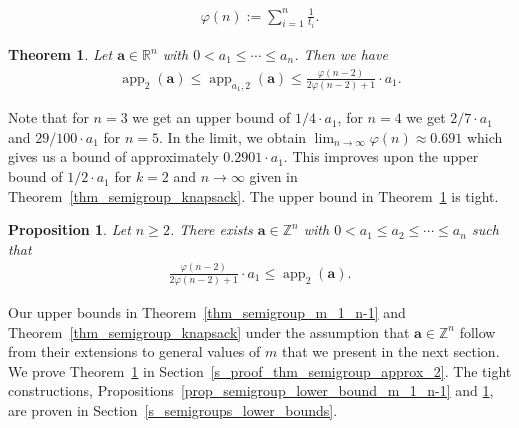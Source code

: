 \documentclass[pdflatex]{sn-jnl}
\DeclareMathOperator{\app}{app}
\newcommand{\R}{\mathbb{R}}
\newcommand{\Z}{\mathbb{Z}}
\newcommand{\ba}{\bm{a}}
\theoremstyle{thmstyleone}%
\newtheorem{theorem}{Theorem}%
\newtheorem{proposition}{Proposition}
\theoremstyle{thmstyletwo}%
\theoremstyle{thmstylethree}%
\begin{document}
	\begin{align*}
		\varphi(n) := \sum_{i=1}^n \frac{1}{t_i}.
	\end{align*}
	
	\begin{theorem}
		\label{thm_semigroup_approx_2}
		Let $\ba\in\R^{n}$ with $0 < a_1\leq \cdots\leq a_n$. Then we have
		\begin{align*}
			\app_2(\ba)\leq \app_{a_1,2}(\ba)\leq\frac{\varphi(n - 2)}{2\varphi(n - 2) + 1}\cdot a_1.
		\end{align*}
	\end{theorem}
	Note that for $n=3$ we get an upper bound of $1/4\cdot a_1$, for $n=4$ we get $2/7\cdot a_1$ and $29/100\cdot a_1$ for $n = 5$. In the limit, we obtain $\lim_{n\to\infty}\varphi(n) \approx 0.691$ which gives us a bound of approximately $0.2901\cdot a_1$. This improves upon the upper bound of $1/2\cdot a_1$ for $k=2$ and $n\to \infty$ given in Theorem~\ref{thm_semigroup_knapsack}. The upper bound in Theorem~\ref{thm_semigroup_approx_2} is tight.
	\begin{proposition}
		\label{prop_semigroup_lower_bound_m_1_n_2}
		Let $n\geq 2$. There exists $\ba\in \Z^{n}$ with $0<a_1\leq a_2\leq\cdots\leq a_n$ such that 
		\begin{align*}
			\frac{\varphi(n-2)}{2\varphi(n-2) + 1}\cdot a_1 \leq \app_2(\ba).
		\end{align*}
	\end{proposition}
	Our upper bounds in Theorem~\ref{thm_semigroup_m_1_n-1} and Theorem~\ref{thm_semigroup_knapsack} under the assumption that $\ba\in \Z^n$ follow from their extensions to general values of $m$ that we present in the next section. 
	We prove Theorem~\ref{thm_semigroup_approx_2} in Section~\ref{s_proof_thm_semigroup_approx_2}. The tight constructions, Propositions~\ref{prop_semigroup_lower_bound_m_1_n-1} and \ref{prop_semigroup_lower_bound_m_1_n_2}, are proven in Section~\ref{s_semigroups_lower_bounds}.
	
\end{document}
